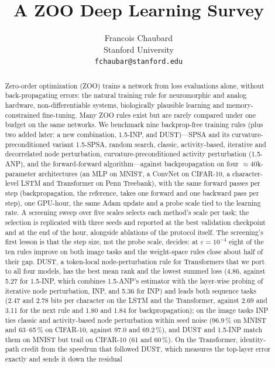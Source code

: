 \documentclass{article}
\title{A ZOO Deep Learning Survey}
\author{%
  Francois Chaubard \\
  Stanford University \\
  \texttt{fchaubar@stanford.edu}
}
\begin{document}
\maketitle

\begin{abstract}
Zero-order optimization (ZOO) trains a network from loss evaluations alone, without
back-propagating errors: the natural training rule for neuromorphic and analog
hardware, non-differentiable systems, biologically plausible learning and
memory-constrained fine-tuning. Many ZOO rules exist but are rarely compared under
one budget on the same networks. We benchmark nine backprop-free training
rules (plus two added later: a new combination, 1.5-INP, and DUST)---SPSA and its curvature-preconditioned variant 1.5-SPSA, random search,
classic, activity-based, iterative and decorrelated node perturbation,
curvature-preconditioned activity perturbation (1.5-ANP), and the forward-forward
algorithm---against backpropagation on four $\approx$40k-parameter architectures (an
MLP on MNIST, a ConvNet on CIFAR-10, a character-level LSTM and Transformer on Penn
Treebank), with the same forward passes per step (backpropagation, the reference, takes one
forward and one backward pass per step), one GPU-hour, the same Adam update and a
probe scale tied to the learning rate. A screening sweep over five scales selects
each method's scale per task; the selection is replicated with three seeds and reported
at the best validation checkpoint and at the end of the hour, alongside ablations of the
protocol itself. The screening's
first lesson is that the step size, not the probe scale, decides: at $\varepsilon=10^{-4}$
eight of the ten rules improve on both image tasks and the weight-space rules close
about half of their gap. DUST, a token-local node-perturbation rule for Transformers
that we port to all four models, has the best mean rank and the lowest summed loss (4.86,
against 5.27 for 1.5-INP, which combines 1.5-ANP's estimator with the layer-wise probing
of iterative node perturbation, INP, and 5.36 for INP) and leads both sequence tasks
(2.47 and 2.78 bits per character on the LSTM and the Transformer, against 2.69 and 3.11
for the next rule and 1.80 and 1.84 for backpropagation); on the image tasks INP ties classic and
activity-based node perturbation within seed noise (96.9\,\% on MNIST and 63--65\,\% on
CIFAR-10, against 97.0 and 69.2\,\%), and DUST and 1.5-INP match them on MNIST but trail on
CIFAR-10 (61 and 60\,\%). On the Transformer, identity-path credit from the speedrun that
followed DUST, which measures the top-layer error exactly and sends it down the residual

\end{abstract}
\end{document}
